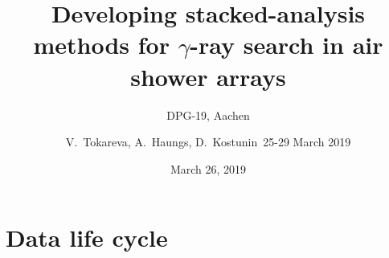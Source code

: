 \documentclass[18pt]{beamer}
\title[$\gamma$-ray search in air shower arrays]{Developing stacked-analysis methods for $\gamma$-ray search in air
shower arrays}
\subtitle{DPG-19, Aachen}
\author[V.~Tokareva, A.~Haungs, D.~Kostunin]{
  V.~Tokareva, A.~Haungs, D.~Kostunin\textbar~25-29 March 2019}
\institute{Institute for Nuclear Physics (IKP)}
\date{March 26, 2019}
\begin{document}



\section{Data life cycle}







\appendix
\beginbackup


\backupend
\end{document}

